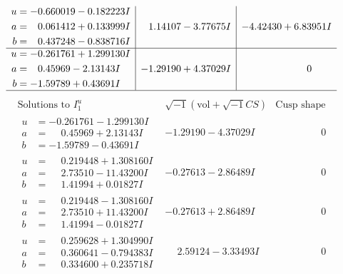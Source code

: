 \documentclass[1p]{elsarticle_modified}
\theoremstyle{definition}
\newcommand{\I}{\sqrt{-1}}
\begin{document}
$$\begin{array}{c|c|c}
\begin{aligned}
u &= -0.660019 - 0.182223 I \\
a &= \phantom{-}0.061412 + 0.133999 I \\
b &= \phantom{-}0.437248 - 0.838716 I\end{aligned}
 & \phantom{-}1.14107 - 3.77675 I & -4.42430 + 6.83951 I \\ \hline\begin{aligned}
u &= -0.261761 + 1.299130 I \\
a &= \phantom{-}0.45969 - 2.13143 I \\
b &= -1.59789 + 0.43691 I\end{aligned}
 & -1.29190 + 4.37029 I & \phantom{-0.000000 } 0\\
 \hline 
 \end{array}$$\newpage$$\begin{array}{c|c|c}  
\text{Solutions to }I^u_{1}& \I (\text{vol} + \sqrt{-1}CS) & \text{Cusp shape}\\
 \hline 
\begin{aligned}
u &= -0.261761 - 1.299130 I \\
a &= \phantom{-}0.45969 + 2.13143 I \\
b &= -1.59789 - 0.43691 I\end{aligned}
 & -1.29190 - 4.37029 I & \phantom{-0.000000 } 0 \\ \hline\begin{aligned}
u &= \phantom{-}0.219448 + 1.308160 I \\
a &= \phantom{-}2.73510 - 11.43200 I \\
b &= \phantom{-}1.41994 + 0.01827 I\end{aligned}
 & -0.27613 - 2.86489 I & \phantom{-0.000000 } 0 \\ \hline\begin{aligned}
u &= \phantom{-}0.219448 - 1.308160 I \\
a &= \phantom{-}2.73510 + 11.43200 I \\
b &= \phantom{-}1.41994 - 0.01827 I\end{aligned}
 & -0.27613 + 2.86489 I & \phantom{-0.000000 } 0 \\ \hline\begin{aligned}
u &= \phantom{-}0.259628 + 1.304990 I \\
a &= \phantom{-}0.360641 - 0.794383 I \\
b &= \phantom{-}0.334600 + 0.235718 I\end{aligned}
 & \phantom{-}2.59124 - 3.33493 I & \phantom{-0.000000 } 0 \\ \hline\begin{aligned}

\end{aligned}
\end{array}$$
\end{document}
